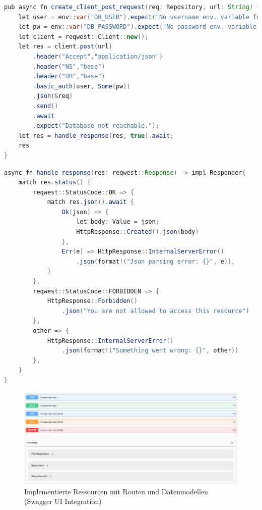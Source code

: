\documentclass[notitlepage, hidelinks]{article}
\begin{document}
\begin{lstlisting}[language=Java,frame=single,caption=Senden eines HTTP Requests (hier an die Datenbank) mit Headern,label=apitwo]
pub async fn create_client_post_request(req: Repository, url: String) -> impl Responder{
    let user = env::var("DB_USER").expect("No username env. variable found");
    let pw = env::var("DB_PASSWORD").expect("No password env. variable found");
    let client = reqwest::Client::new();
    let res = client.post(url)
        .header("Accept","application/json")
        .header("NS","base")
        .header("DB","base")
        .basic_auth(user, Some(pw))
        .json(&req)
        .send()
        .await
        .expect("Database not reachable.");
    let res = handle_response(res, true).await;
    res
}
\end{lstlisting}

\begin{lstlisting}[language=Java,frame=single,caption=Auflösung des Responses (als Option) mit Pattern Matching,label=apitwo]
async fn handle_response(res: reqwest::Response) -> impl Responder{
    match res.status() {
        reqwest::StatusCode::OK => {
            match res.json().await {
                Ok(json) => {
                    let body: Value = json;
                    HttpResponse::Created().json(body)
                },
                Err(e) => HttpResponse::InternalServerError()
                    .json(format!("Json parsing error: {}", e)),
            }
        },
        reqwest::StatusCode::FORBIDDEN => {
            HttpResponse::Forbidden()
                .json("You are not allowed to access this resource")
        },
        other => {
            HttpResponse::InternalServerError()
                .json(format!("Something went wrong: {}", other))
        },
    }
}
\end{lstlisting}

\begin{figure}[H]
\centering
  \includegraphics[width=\textwidth]{images/swagger.png}
  \caption{Implementierte Ressourcen mit Routen und Datenmodellen (Swagger UI Integration)}
  \label{fig:apione}
\end{figure}
\end{document}
